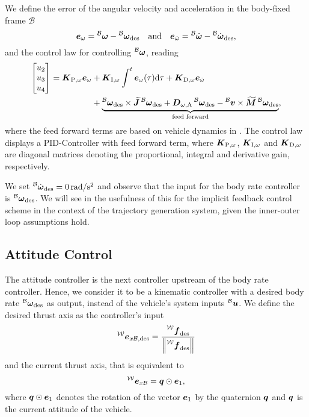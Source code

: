 We define the error of the angular velocity and acceleration in the body-fixed frame $\mathcal{B}$
\begin{equation}
	\vangerror = \vangbody - \vangdesiredbody \quad \text{and} \quad
	\aangerror = \aangbody - \aangdesiredbody
	,
\end{equation}
and the control law for controlling $\prescript{\mathcal{B}}{}{\mbox{$\bm{\omega}$}}$, reading
\begin{align}
	\begin{bmatrix}
		u_2 \\ u_3 \\ u_4
	\end{bmatrix}
	=
	\KpBodyRate \vangerror
	&+ \KiBodyRate \int_{}^{t} \vangerror(\tau)\text{d}\tau
	+ \KdBodyRate \aangerror \\\nonumber
	&+\underbrace{
		\vangdesiredbody \times \Jbs \vangdesiredbody
		+ \Domegaadded \vangdesiredbody
		- \vlinbody \times \Mbs \vangdesiredbody
	}_{\text{feed forward}}
	,
\end{align}
where the feed forward terms are based on vehicle dynamics in . The control law displays a PID-Controller with feed forward term, where $\mbox{$\bm{K}$}_{\text{P},\omega}$, $\mbox{$\bm{K}$}_{\text{I},\omega}$ and $\mbox{$\bm{K}$}_{\text{D},\omega}$ are diagonal matrices denoting the proportional, integral and derivative gain, respectively.

We set $\aangdesiredbody = \unit[0]{rad/s^2}$ and observe that the input for the body rate controller is $\vangdesiredbody$. We will see in  the usefulness of this for the implicit feedback control scheme in the context of the trajectory generation system, given the inner-outer loop assumptions hold.

\subsection{Attitude Control}
The attitude controller is the next controller upstream of the body rate controller. Hence, we consider it to be a kinematic controller with a desired body rate $\vangdesiredbody$ as output, instead of the vehicle's system inputs $\prescript{\mathcal{B}}{}{\mbox{$\bm{u}$}}$. We define the desired thrust axis as the controller's input 
\begin{equation}
	\exdesiredbodyinworld =
	\frac{\thrustdesiredworld}{
		\left\lVert\thrustdesiredworld\right\rVert
	}
\end{equation}
and the current thrust axis, that is equivalent to 
\begin{equation}
	\prescript{\mathcal{W}}{}{\mbox{$\bm{e}$}}_{x\mathcal{B}} = \mbox{$\bm{q}$} \odot \mbox{$\bm{e}$}_1
	,
\end{equation}
where $\mbox{$\bm{q}$} \odot \mbox{$\bm{e}$}_1$ denotes the rotation of the vector $\mbox{$\bm{e}$}_1$ by the quaternion $\mbox{$\bm{q}$}$ and $\mbox{$\bm{q}$}$ is the current attitude of the vehicle.

